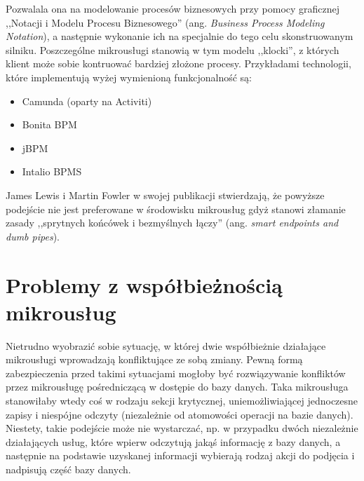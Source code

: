 \documentclass[licencjacka]{pracamgr}
\begin{document}
Pozwalala ona na modelowanie procesów biznesowych przy pomocy graficznej
,,Notacji i Modelu Procesu Biznesowego'' (ang. \textit{Business Process Modeling
Notation}), a następnie wykonanie ich na specjalnie do tego celu skonstruowanym
silniku. Poszczególne mikrousługi stanowią w tym modelu ,,klocki'', z których
klient może sobie kontruować bardziej złożone procesy. Przykładami technologii,
które implementują wyżej wymienioną funkcjonalność są:
\begin{itemize}
	\item Camunda (oparty na Activiti)
	\item Bonita BPM
	\item jBPM
	\item Intalio BPMS
\end{itemize}

James Lewis i Martin Fowler w swojej publikacji \cite{fowlermicroservices}
stwierdzają, że powyższe podejście nie jest preferowane w środowisku mikrousług
gdyż stanowi złamanie zasady ,,sprytnych końcówek i bezmyślnych łączy'' (ang.
\textit{smart endpoints and dumb pipes}).

\section{Problemy z współbieżnością mikrousług}

Nietrudno wyobrazić sobie sytuację, w której dwie współbieżnie działające mikrousługi
wprowadzają konfliktujące ze sobą zmiany. Pewną formą zabezpieczenia przed takimi sytuacjami
mogłoby być rozwiązywanie konfliktów przez mikrousługę pośredniczącą w dostępie do bazy danych.
Taka mikrousługa stanowiłaby wtedy coś w rodzaju sekcji krytycznej, uniemożliwiającej jednoczesne zapisy
i niespójne odczyty (niezależnie od atomowości operacji na bazie danych). 
Niestety, takie podejście może nie wystarczać, np. w przypadku dwóch niezależnie działających usług, które wpierw
odczytują jakąś informację z bazy danych, a następnie na podstawie uzyskanej informacji wybierają rodzaj
akcji do podjęcia i nadpisują część bazy danych.
\end{document}
